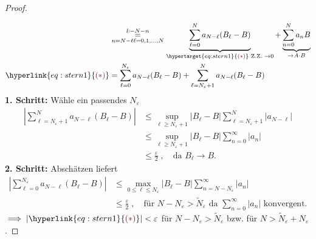 \documentclass[a4paper,10pt]{scrbook}
\begin{document}
\begin{theorem}
\begin{proof}
\begin{figure}[H]
      \vspace*{-3em}
    \end{figure}
    \begin{align*}
      &\overset{l \coloneq N - n}{\underset{\substack{n = N-\ell}{\ell = 0,1,\ldots,N}}{=}}
        \underbrace{\sum\limits_{\ell = 0}^{N} a_{N - \ell} (B_{\ell} - B)}_{\hypertarget{eq:stern1}{{\color{DarkRed} (\ast)}} \text{ Z.Z. } \to 0} + \underbrace{\sum\limits_{n=0}^{N} a_n B}_{\to A \cdot B} \\
      \hyperlink{eq:stern1}{{\color{DarkRed} (\ast)}} &= \sum\limits_{\ell = 0}^{N_{\varepsilon}} a_{N-\ell} (B_{\ell} - B) + \sum\limits_{\ell=N_{\varepsilon}+1}^{N} a_{N-\ell} (B_{\ell} - B)
    \end{align*}
    \textbf{1. Schritt:} Wähle ein passendes $N_{\varepsilon}$
    \begin{align*}
      \left| \sum\limits_{\ell=N_{\varepsilon}+1}^{N} a_{N-\ell} (B_{\ell} - B) \right|
      &\leq \sup\limits_{\ell \geq N_{\varepsilon}+1} |B_{\ell} - B| \sum\limits_{\ell=N_{\varepsilon}+1}^{N} |a_{N-\ell}| \\
      &\leq \sup\limits_{\ell \geq N_{\varepsilon}+1} |B_{\ell} - B| \sum\limits_{n=0}^{\infty} |a_n| \\
      &\leq \frac{\varepsilon}{2} \; , \quad \text{da } B_{\ell} \to B.
    \end{align*}
    \textbf{2. Schritt:} Abschätzen liefert
    \begin{align*}
      \left| \sum\limits_{\ell = 0}^{N_{\varepsilon}} a_{N-\ell} (B_{\ell} - B) \right|
      &\leq \max\limits_{0 \leq \ell \leq N_{\varepsilon}} |B_{\ell} - B| \sum\limits_{n=N-N_{\varepsilon}}^{\infty} |a_n| \\
      &\leq \frac{\varepsilon}{2} \; , \quad \text{für } N - N_{\varepsilon} > \widetilde{N}_{\varepsilon} \text{ da } \sum\limits_{n=0}^{\infty} |a_n| \text{ konvergent}.
    \end{align*}
    $\implies |\hyperlink{eq:stern1}{{\color{DarkRed} (\ast)}}| < \varepsilon$ für $N - N_{\varepsilon} > \widetilde{N}_{\varepsilon}$ bzw. für $N > \widetilde{N}_{\varepsilon} + N_{\varepsilon}$.
  \end{proof}
\end{theorem}
\end{document}
